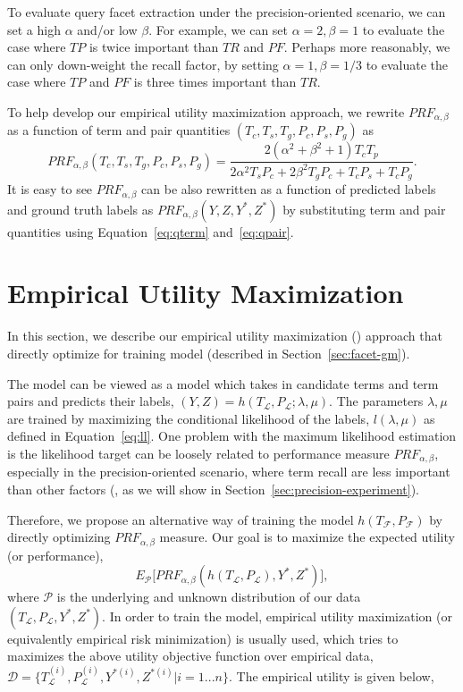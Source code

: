 To evaluate query facet extraction under the precision-oriented scenario, we can set a high $\alpha$ and/or low $\beta$. For example, we can set $\alpha\!=\!2,\beta\!=\!1$ to evaluate the case where $T\!P$ is twice important than $T\!R$ and $P\!F$. Perhaps more reasonably, we can only down-weight the recall factor, by setting $\alpha\!=\!1,\beta\!=\!1/3$ to evaluate the case where $T\!P$ and $P\!F$ is three times important than $T\!R$.

To help develop our empirical utility maximization approach, we rewrite $P\!R\!F_{\alpha,\beta}$ as a function of term and pair quantities $(T_c,T_s,T_g,P_c,P_s,P_g)$ as
\begin{equation}
\label{eq:prfc}
 P\!R\!F_{\alpha,\beta}(T_c,T_s,T_g,P_c,P_s,P_g) =\frac{2(\alpha^2 + \beta^2 + 1)T_cT_p}{2\alpha^2T_sP_c+2\beta^2T_gP_c+T_cP_s+T_cP_g}.
\end{equation}
It is easy to see $P\!R\!F_{\alpha,\beta}$ can be also rewritten as a function of predicted labels and ground truth labels as $P\!R\!F_{\alpha,\beta}(Y,Z,Y^{*},Z^{*})$ by substituting term and pair quantities using Equation~\ref{eq:qterm} and~\ref{eq:qpair}.


\section{Empirical Utility Maximization}
\label{sec:precision-eum}
In this section, we describe our empirical utility maximization (\EUM) approach that directly optimize \PRF for training \QF model (described in Section~\ref{sec:facet-gm}). 

The \QF model can be viewed as a model which takes in candidate terms and term pairs and predicts their labels, $(Y, Z)=h(T_\mathcal{L},P_\mathcal{L};\lambda,\mu)$. The parameters $\lambda,\mu$ are trained by maximizing the conditional likelihood of the labels, $l(\lambda,\mu)$ as defined in Equation~\ref{eq:ll}. One problem with the maximum likelihood estimation is the likelihood target can be loosely related to performance measure $P\!R\!F_{\alpha,\beta}$, especially in the precision-oriented scenario, where term recall are less important than other factors (, as we will show in Section~\ref{sec:precision-experiment}).

Therefore, we propose an alternative way of training the model $h(T_\mathcal{F},P_\mathcal{F})$ by directly optimizing $P\!R\!F_{\alpha,\beta}$ measure. Our goal is to maximize the expected utility (or performance),
\begin{equation}
 E_\mathcal{P}\big[P\!R\!F_{\alpha,\beta}(h(T_\mathcal{L},P_\mathcal{L}),Y^*,Z^*)\big],
\end{equation}
where $\mathcal{P}$ is the underlying and unknown distribution of our data $(T_\mathcal{L},P_\mathcal{L},Y^*,Z^*)$. In order to train the model, empirical utility maximization (or equivalently empirical risk minimization) is usually used, which tries to maximizes the above utility objective function over empirical data,  $\mathcal{D}=\{T_{\mathcal{L}}^{(i)},P_{\mathcal{L}}^{(i)},Y^{*(i)},Z^{*(i)}|i=1...n\}$. The empirical utility is given below, 

